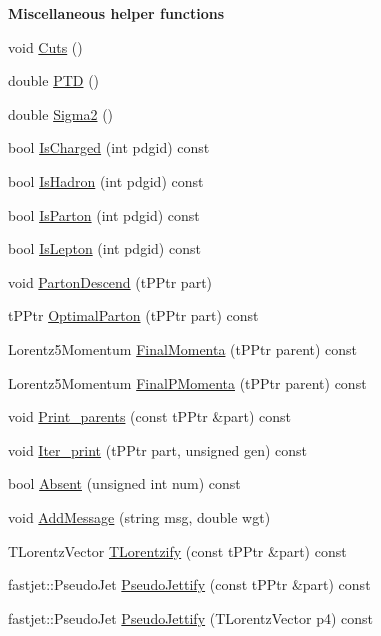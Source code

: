 \begin{Indent}{\bf Miscellaneous helper functions}\par
\begin{DoxyCompactItemize}
\item 
void \hyperlink{class_herwig_1_1_herwig_tree_aeb56d225d324365a52789a1949a6452b}{Cuts} ()
\item 
double \hyperlink{class_herwig_1_1_herwig_tree_a153d67d1f7a9e992906e7159636d5f2b}{P\+TD} ()
\item 
double \hyperlink{class_herwig_1_1_herwig_tree_a4907ce27ad1397dc907c7a1c34307ecb}{Sigma2} ()
\item 
bool \hyperlink{class_herwig_1_1_herwig_tree_ac9d8b482bcf0533674bd6d6d1be099d1}{Is\+Charged} (int pdgid) const 
\item 
bool \hyperlink{class_herwig_1_1_herwig_tree_ae34cc1baf995effda3cdefac42e919cb}{Is\+Hadron} (int pdgid) const 
\item 
bool \hyperlink{class_herwig_1_1_herwig_tree_adbb3787d260f0e607ddc416d3ede25a1}{Is\+Parton} (int pdgid) const 
\item 
bool \hyperlink{class_herwig_1_1_herwig_tree_a66916f6b6b836a0fb1f824c2072051c2}{Is\+Lepton} (int pdgid) const 
\item 
void \hyperlink{class_herwig_1_1_herwig_tree_a7b26f690399e3b09a3a932914b2ee004}{Parton\+Descend} (t\+P\+Ptr part)
\item 
t\+P\+Ptr \hyperlink{class_herwig_1_1_herwig_tree_a4f813c334d7580baaf3ff5bc09ab4ba7}{Optimal\+Parton} (t\+P\+Ptr part) const 
\item 
Lorentz5\+Momentum \hyperlink{class_herwig_1_1_herwig_tree_a62fdf42b0dea6df4c413a443febdd5d7}{Final\+Momenta} (t\+P\+Ptr parent) const 
\item 
Lorentz5\+Momentum \hyperlink{class_herwig_1_1_herwig_tree_a6860912cfb61e8e17b039ee8a03eabc7}{Final\+P\+Momenta} (t\+P\+Ptr parent) const 
\item 
void \hyperlink{class_herwig_1_1_herwig_tree_a1879d8a4e4b59c7ce1ca8d667bc2ee75}{Print\+\_\+parents} (const t\+P\+Ptr \&part) const 
\item 
void \hyperlink{class_herwig_1_1_herwig_tree_ae41aeb0678da062374c772796f990c92}{Iter\+\_\+print} (t\+P\+Ptr part, unsigned gen) const 
\item 
bool \hyperlink{class_herwig_1_1_herwig_tree_ab962acb7d1acbdd99aacfaaf6a2c3c04}{Absent} (unsigned int num) const 
\item 
void \hyperlink{class_herwig_1_1_herwig_tree_aff161fa1b8517b8e28eec5b845a987e6}{Add\+Message} (string msg, double wgt)
\item 
T\+Lorentz\+Vector \hyperlink{class_herwig_1_1_herwig_tree_a07d4fcc254706e8380c47a30bcc8f303}{T\+Lorentzify} (const t\+P\+Ptr \&part) const 
\item 
fastjet\+::\+Pseudo\+Jet \hyperlink{class_herwig_1_1_herwig_tree_a9d29816b401eaf3746db1c91f8d03549}{Pseudo\+Jettify} (const t\+P\+Ptr \&part) const 
\item 
fastjet\+::\+Pseudo\+Jet \hyperlink{class_herwig_1_1_herwig_tree_a8941cb1d95ce44bad9f88e24004b666b}{Pseudo\+Jettify} (T\+Lorentz\+Vector p4) const 
\end{DoxyCompactItemize}
\end{Indent}
